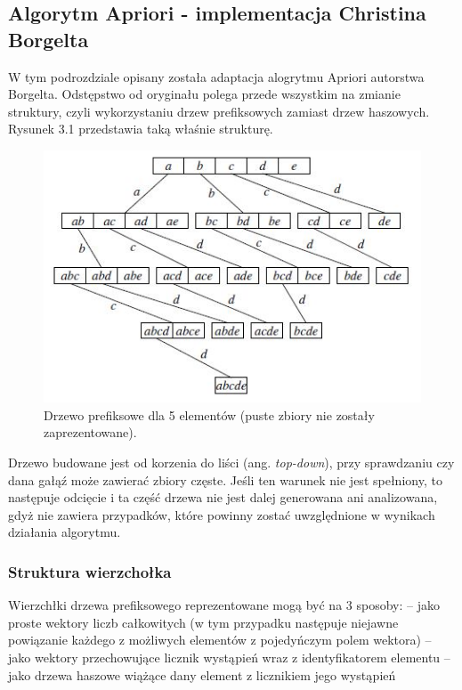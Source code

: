 \subsection{Algorytm Apriori - implementacja Christina Borgelta \cite{Borgelt}}
\label{c322}
W tym podrozdziale opisany została adaptacja alogrytmu Apriori autorstwa Borgelta. Odstępstwo od oryginału polega przede wszystkim na zmianie struktury, czyli wykorzystaniu drzew prefiksowych zamiast drzew haszowych. Rysunek 3.1 przedstawia taką właśnie strukturę. 
\begin{figure}[h]
\centering
\includegraphics[width=0.8\linewidth]{figures/prefixTreeBorgelt}
\caption[Rysunek 3.1]{Drzewo prefiksowe dla 5 elementów (puste zbiory nie zostały zaprezentowane).}
\label{fig:prefixTreeBorgelt}
\end{figure}
Drzewo budowane jest od korzenia do liści (ang. \textit{top-down}), przy sprawdzaniu czy dana gałąź może zawierać zbiory częste. Jeśli ten warunek nie jest spełniony, to następuje odcięcie i ta część drzewa nie jest dalej generowana ani analizowana, gdyż nie zawiera przypadków, które powinny zostać uwzględnione w wynikach działania algorytmu. 

\subsubsection*{Struktura wierzchołka}
Wierzchłki drzewa prefiksowego reprezentowane mogą być na 3 sposoby:\newline
-- jako proste wektory liczb całkowitych (w tym przypadku następuje niejawne powiązanie każdego z możliwych elementów z pojedyńczym polem wektora)\newline
-- jako wektory przechowujące licznik wystąpień wraz z identyfikatorem elementu\newline
-- jako drzewa haszowe wiążące dany element z licznikiem jego wystąpień


